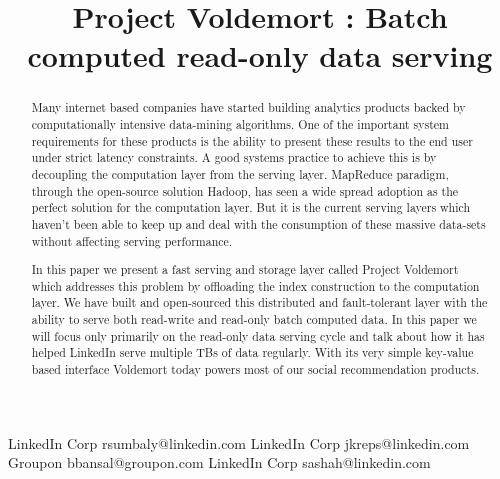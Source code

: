 \documentclass[10pt,twocolumn,preprint,natbib,authoryear]{sigplanconf}
\begin{document}
\copyrightdata{[to be supplied]} 


\title{Project Voldemort : Batch computed read-only data serving}

           {LinkedIn Corp}
           {rsumbaly@linkedin.com}
           {LinkedIn Corp}
           {jkreps@linkedin.com}
		   {Groupon}
           {bbansal@groupon.com}
           {LinkedIn Corp}
           {sashah@linkedin.com}


				
\maketitle

\begin{abstract}
Many internet based companies have started building analytics products backed by computationally intensive data-mining algorithms. One of the important system requirements for these products is the ability to present these results to the end user under strict latency constraints. A good systems practice to achieve this is by decoupling the computation layer from the serving layer. MapReduce paradigm, through the open-source solution Hadoop, has seen a wide spread adoption as the perfect solution for the computation layer. But it is the current serving layers which haven't been able to keep up and deal with the consumption of these massive data-sets without affecting serving performance. 

In this paper we present a fast serving and storage layer called Project Voldemort which addresses this problem by offloading the index construction to the computation layer. We have built and open-sourced this distributed and fault-tolerant layer with the ability to serve both read-write and read-only batch computed data. In this paper we will focus only primarily on the read-only data serving cycle and talk about how it has helped LinkedIn serve multiple TBs of data regularly. With its very simple key-value based interface Voldemort today powers most of our social recommendation products. 
\end{abstract}
\end{document}
